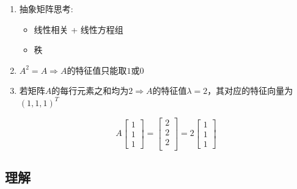 \documentclass[./linear_algebra.tex]{subfiles}
\begin{document}
\begin{enumerate}
\begin{itemize}
            \item 特征值$\lambda \Rightarrow |A - \lambda E| = 0$
        \end{itemize}
        \item 抽象矩阵思考:
        \begin{itemize}
            \item 线性相关 + 线性方程组
            \item 秩
        \end{itemize}
        \item $A^2 = A \Rightarrow A$的特征值只能取$1$或$0$
        \item 若矩阵$A$的每行元素之和均为$2 \Rightarrow A$的特征值$\lambda = 2$，其对应的特征向量为$(1, 1, 1)^T$
        \begin{analysisbox}
            \[
                A\begin{bmatrix}
                     1 \\
                     1 \\
                     1
                \end{bmatrix} = \begin{bmatrix}
                                    2 \\
                                    2 \\
                                    2 \\
                \end{bmatrix} = 2\begin{bmatrix}
                                     1 \\
                                     1 \\
                                     1
                \end{bmatrix}
            \]
        \end{analysisbox}
    \end{enumerate}

    \subsection{理解}
\end{document}
